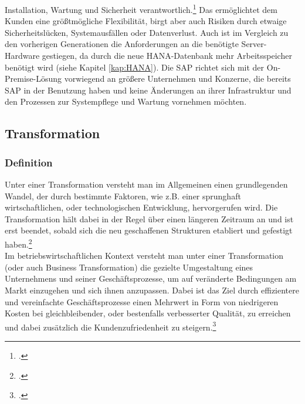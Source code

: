Installation, Wartung und Sicherheit verantwortlich.\footcite[Vgl.][]{rz10-s4hana} Das ermöglichtet dem Kunden eine größtmögliche Flexibilität, birgt aber auch Risiken durch etwaige Sicherheitslücken, Systemausfällen oder Datenverlust. Auch ist im Vergleich zu den vorherigen Generationen die Anforderungen an die benötigte Server-Hardware gestiegen, da durch die neue HANA-Datenbank mehr Arbeitsspeicher benötigt wird (siehe Kapitel \ref{kap:HANA}). Die SAP richtet sich mit der On-Premise-Lösung vorwiegend an größere Unternehmen und Konzerne, die bereits SAP in der Benutzung haben und keine Änderungen an ihrer Infrastruktur und den Prozessen zur Systempflege und Wartung vornehmen möchten.  

\subsection{Transformation}
\subsubsection{Definition}
Unter einer Transformation versteht man im Allgemeinen einen grundlegenden Wandel, der durch bestimmte Faktoren, wie z.B. einer sprunghaft wirtschaftlichen, oder technologischen Entwicklung, hervorgerufen wird. Die Transformation hält dabei in der Regel über einen längeren Zeitraum an und ist erst beendet, sobald sich die neu geschaffenen Strukturen etabliert und gefestigt haben.\footcite[Vgl.][]{difu}\\ Im betriebswirtschaftlichen Kontext versteht man unter einer Transformation (oder auch Business Transformation) die gezielte Umgestaltung eines Unternehmens und seiner Geschäftsprozesse, um auf veränderte Bedingungen am Markt einzugehen und sich ihnen anzupassen. Dabei ist das Ziel durch effizientere und vereinfachte Geschäftsprozesse einen Mehrwert in Form von niedrigeren Kosten bei gleichbleibender, oder bestenfalls verbesserter Qualität, zu erreichen und dabei zusätzlich die Kundenzufriedenheit zu steigern.\footcite[Vgl.][]{leanix}

